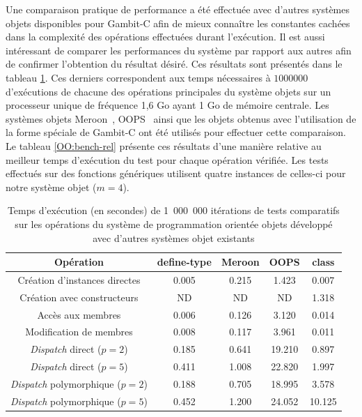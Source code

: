 \documentclass[12pt,twoside,letterpaper,francais]{book}
\newcommand{\customizedTableName}{\textsc{Tableau}}
\newcommand{\scheme}[1]{\selectlanguage{english}{\tt #1}\selectlanguage{french}}
\begin{document}
Une comparaison pratique de performance a été effectuée avec d'autres
systèmes objets disponibles pour Gambit-C afin de mieux connaître les
constantes cachées dans la complexité des opérations effectuées durant
l'exécution. Il est aussi intéressant de comparer les performances du
système par rapport aux autres afin de confirmer l'obtention du
résultat désiré. Ces résultats sont présentés dans le tableau
\ref{OO:bench}. Ces derniers correspondent aux temps nécessaires à $1
000 000$ d'exécutions de chacune des opérations principales du système
objets sur un processeur unique de fréquence 1,6 Go ayant 1 Go de
mémoire centrale. Les systèmes objets Meroon~\cite{MEROON},
OOPS~\cite{OOPS} ainsi que les objets obtenus avec l'utilisation de la
forme spéciale \scheme{define-type} de Gambit-C ont été utilisés pour
effectuer cette comparaison. Le tableau \ref{OO:bench-rel} présente
ces résultats d'une manière relative au meilleur temps d'exécution du
test pour chaque opération vérifiée. Les tests effectués sur des
fonctions génériques utilisent quatre instances de celles-ci pour
notre système objet ($m=4$).

\renewcommand{\tablename}{\customizedTableName}
\begin{table}
  \center
  \begin{tabular}{ccccc}
    \hline
    Opération & define-type & Meroon & OOPS & class \\
    \hline \hline
    Création d'instances directes           & 0.005 & 0.215 & 1.423 & 0.007\\
    Création avec constructeurs             & ND    & ND    & ND    & 1.318\\
    Accès aux membres                       & 0.006 & 0.126 & 3.120 & 0.014\\
    Modification de membres                 & 0.008 & 0.117 & 3.961 & 0.011\\
    \textit{Dispatch} direct ($p=2$)        & 0.185 & 0.641 & 19.210 & 0.897\\
    \textit{Dispatch} direct ($p=5$)        & 0.411 & 1.008 & 22.820 & 1.997\\ 
    \textit{Dispatch} polymorphique ($p=2$) & 0.188 & 0.705 & 18.995 & 3.578\\
    \textit{Dispatch} polymorphique ($p=5$) & 0.452 & 1.200 & 24.052 & 10.125\\
    \hline
  \end{tabular}
  \caption{Temps d'exécution (en secondes) de 1~000~000 itérations de
    tests comparatifs sur les opérations du système de programmation
    orientée objets développé avec d'autres systèmes objet existants}
  \label{OO:bench}
\end{table}
\end{document}
